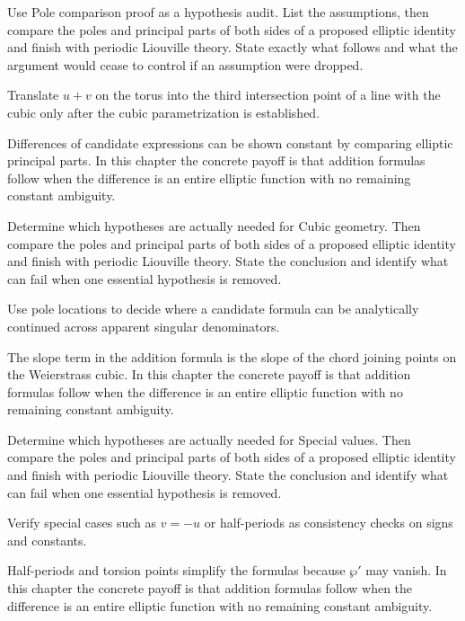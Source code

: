 \begin{exercise}\label{exr:iv30-06}
Use Pole comparison proof as a hypothesis audit. List the assumptions, then compare the poles and principal parts of both sides of a proposed elliptic identity and finish with periodic Liouville theory. State exactly what follows and what the argument would cease to control if an assumption were dropped.
\end{exercise}
\begin{hint}
Translate \(u+v\) on the torus into the third intersection point of a line with the cubic only after the cubic parametrization is established.
\end{hint}
\begin{solution}
Differences of candidate expressions can be shown constant by comparing elliptic principal parts. In this chapter the concrete payoff is that addition formulas follow when the difference is an entire elliptic function with no remaining constant ambiguity.
\end{solution}

\begin{exercise}\label{exr:iv30-07}
Determine which hypotheses are actually needed for Cubic geometry. Then compare the poles and principal parts of both sides of a proposed elliptic identity and finish with periodic Liouville theory. State the conclusion and identify what can fail when one essential hypothesis is removed.
\end{exercise}
\begin{hint}
Use pole locations to decide where a candidate formula can be analytically continued across apparent singular denominators.
\end{hint}
\begin{solution}
The slope term in the addition formula is the slope of the chord joining points on the Weierstrass cubic. In this chapter the concrete payoff is that addition formulas follow when the difference is an entire elliptic function with no remaining constant ambiguity.
\end{solution}

\begin{exercise}\label{exr:iv30-08}
Determine which hypotheses are actually needed for Special values. Then compare the poles and principal parts of both sides of a proposed elliptic identity and finish with periodic Liouville theory. State the conclusion and identify what can fail when one essential hypothesis is removed.
\end{exercise}
\begin{hint}
Verify special cases such as \(v=-u\) or half-periods as consistency checks on signs and constants.
\end{hint}
\begin{solution}
Half-periods and torsion points simplify the formulas because $\wp'$ may vanish. In this chapter the concrete payoff is that addition formulas follow when the difference is an entire elliptic function with no remaining constant ambiguity.
\end{solution}

